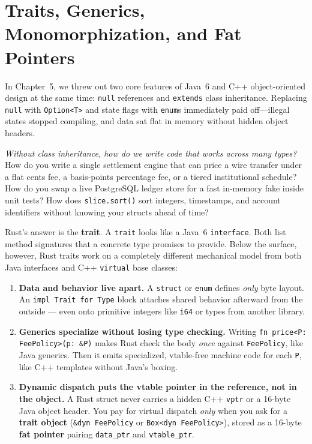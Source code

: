 \chapter{Traits, Generics, Monomorphization, and Fat Pointers}
\label{ch06:traits-generics-dispatch}

In Chapter~5, we threw out two core features of Java~6 and C++ object-oriented design at the same time: \texttt{null} references and \texttt{extends} class inheritance. Replacing \texttt{null} with \texttt{Option<T>} and state flags with \texttt{enum}s immediately paid off---illegal states stopped compiling, and data sat flat in memory without hidden object headers.

\emph{Without class inheritance, how do we write code that works across many types?} How do you write a single settlement engine that can price a wire transfer under a flat cents fee, a basis-points percentage fee, or a tiered institutional schedule? How do you swap a live PostgreSQL ledger store for a fast in-memory fake inside unit tests? How does \texttt{slice.sort()} sort integers, timestamps, and account identifiers without knowing your structs ahead of time?

Rust's answer is the \textbf{trait}. A \texttt{trait} looks like a Java~6 \texttt{interface}. Both list method signatures that a concrete type promises to provide. Below the surface, however, Rust traits work on a completely different mechanical model from both Java interfaces and C++ \texttt{virtual} base classes:

\begin{enumerate}
  \item \textbf{Data and behavior live apart.} A \texttt{struct} or \texttt{enum} defines \emph{only} byte layout. An \texttt{impl Trait for Type} block attaches shared behavior afterward from the outside --- even onto primitive integers like \texttt{i64} or types from another library.
  \item \textbf{Generics specialize without losing type checking.} Writing \texttt{fn price<P: FeePolicy>(p: \&P)} makes Rust check the body \emph{once} against \texttt{FeePolicy}, like Java generics. Then it emits specialized, vtable-free machine code for each \texttt{P}, like C++ templates without Java's boxing.
  \item \textbf{Dynamic dispatch puts the vtable pointer in the reference, not in the object.} A Rust struct never carries a hidden C++ \texttt{vptr} or a 16-byte Java object header. You pay for virtual dispatch \emph{only} when you ask for a \textbf{trait object} (\texttt{\&dyn FeePolicy} or \texttt{Box<dyn FeePolicy>}), stored as a 16-byte \textbf{fat pointer} pairing \texttt{data\_ptr} and \texttt{vtable\_ptr}.
\end{enumerate}

